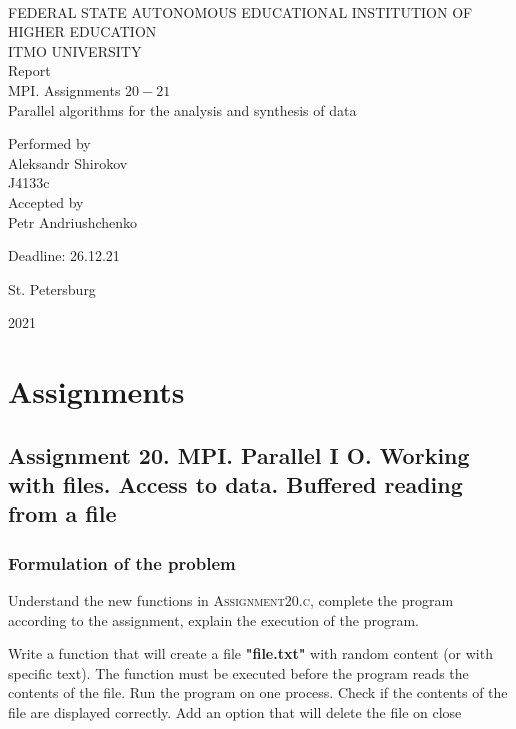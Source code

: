 \documentclass[%
12pt, %
final, %
oneside, %
onecolumn, %
centertags]{article} %
\theoremstyle{plain}
\theoremstyle{definition}
\theoremstyle{remark}
\begin{document}
	\begin{titlepage} 
		\begin{center}
		\textbf{}\\[2.0cm]
		\LARGE FEDERAL STATE AUTONOMOUS EDUCATIONAL INSTITUTION OF HIGHER EDUCATION \\[0.5cm]
		\Large ITMO UNIVERSITY \\[3cm]
		\LARGE Report\\
		\Large MPI. Assignments $20-21$ \\
		\Large Parallel algorithms for the analysis and synthesis of data \\[4cm]


		\begin{flushright}
		Performed by\\
		Aleksandr Shirokov\\
		J4133c\\
		Accepted by\\
		Petr Andriushchenko

		Deadline: 26.12.21
		\end{flushright}

		\vfill 

		{\Large {St. Petersburg}} \par
		{\Large {2021}}
		\end{center} 
	\end{titlepage}

\tableofcontents
\newpage


\section{Assignments}

\subsection{Assignment 20. MPI. Parallel I \/ O. Working with files. Access to data. Buffered reading from a file}

\subsubsection{Formulation of the problem}

Understand the new functions in \textsc{Assignment20.c}, complete the program according to the 
assignment, explain the execution of the program.

Write a function that will create a file \textbf{"file.txt"} with random content (or with specific text). The 
function must be executed before the program reads the contents of the file. Run the program 
on one process. Check if the contents of the file are displayed correctly. Add an option that will 
delete the file on close
\end{document}
